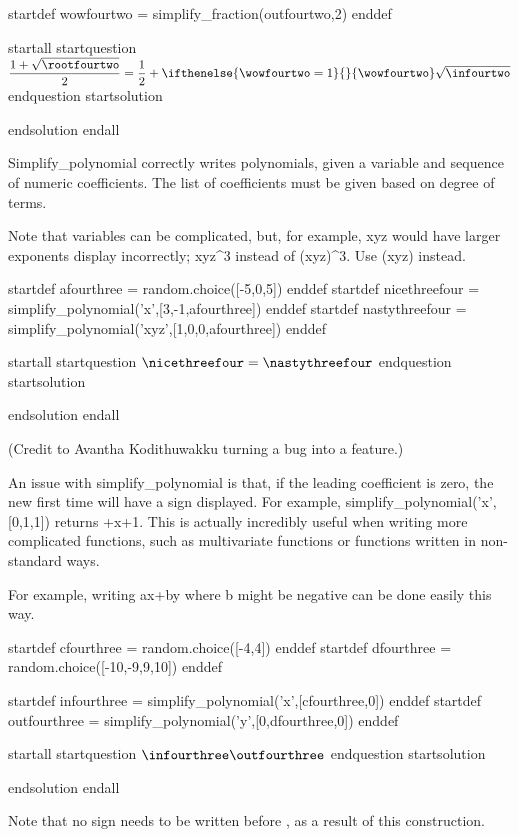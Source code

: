 startdef wowfourtwo = simplify_fraction(outfourtwo,2) enddef

startall
startquestion $\dfrac{1+\sqrt{\rootfourtwo}}{2} = \dfrac{1}{2} + \ifthenelse{\wowfourtwo = 1}{}{\wowfourtwo} \sqrt{\infourtwo}$
endquestion
startsolution \item endsolution
endall




Simplify_polynomial correctly writes polynomials, given a variable and sequence of numeric coefficients. The list of coefficients must be given based on degree of terms. 

Note that variables can be complicated, but, for example, xyz would have larger exponents display incorrectly; xyz^3 instead of (xyz)^3. Use (xyz) instead.

startdef afourthree = random.choice([-5,0,5]) enddef
startdef nicethreefour = simplify_polynomial('x',[3,-1,afourthree]) enddef
startdef nastythreefour = simplify_polynomial('xyz',[1,0,0,afourthree]) enddef

startall
startquestion  $\nicethreefour = \nastythreefour$ endquestion
startsolution \item  endsolution
endall




(Credit to Avantha Kodithuwakku turning a bug into a feature.)

An issue with simplify_polynomial is that, if the leading coefficient is zero, the new first time will have a sign displayed. For example, simplify_polynomial('x',[0,1,1]) returns +x+1. This is actually incredibly useful when writing more complicated functions, such as multivariate functions or functions written in non-standard ways.

For example, writing ax+by where b might be negative can be done easily this way.

startdef cfourthree = random.choice([-4,4]) enddef
startdef dfourthree = random.choice([-10,-9,9,10]) enddef

startdef infourthree = simplify_polynomial('x',[cfourthree,0]) enddef
startdef outfourthree = simplify_polynomial('y',[0,dfourthree,0]) enddef

startall
startquestion  $\infourthree \outfourthree$ endquestion
startsolution \item  endsolution
endall

Note that no sign needs to be written before \outfourthree, as a result of this construction.



